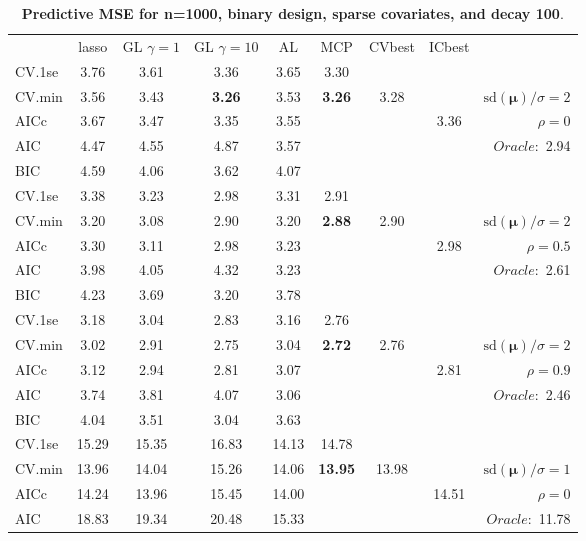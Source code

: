 \begin{table}\vspace{-.5cm}
\caption[l]{ { \bf Predictive MSE for n=1000, binary design, 
sparse covariates, and  decay  100}.}
\vspace{-.5cm}
\footnotesize{}
\begin{center}
\begin{tabular}{l*{7}{c}|r}
 & lasso & GL $\gamma=1$ & GL $\gamma=10$ & AL & MCP  & CVbest & ICbest  \\
\cline{1-9}
CV.1se & 3.76 & 3.61 & 3.36 & 3.65 & 3.30 & & & \\
CV.min & 3.56 & 3.43 & {\bf 3.26} & 3.53 & {\bf 3.26} & 3.28 & & $\mathrm{sd}(\mathbf{\mu})/\sigma=2$ \\
AICc & 3.67 & 3.47 & 3.35 & 3.55 & & & 3.36 &  $\rho=0$ \\
AIC & 4.47 & 4.55 & 4.87 & 3.57 & & & &  \multirow{2}{*}{$Oracle: $ 2.94} \\
BIC & 4.59 & 4.06 & 3.62 & 4.07 & & & &  \\
 \hline 
CV.1se & 3.38 & 3.23 & 2.98 & 3.31 & 2.91 & & & \\
CV.min & 3.20 & 3.08 & 2.90 & 3.20 & {\bf 2.88} & 2.90 & & $\mathrm{sd}(\mathbf{\mu})/\sigma=2$ \\
AICc & 3.30 & 3.11 & 2.98 & 3.23 & & & 2.98 &  $\rho=0.5$ \\
AIC & 3.98 & 4.05 & 4.32 & 3.23 & & & &  \multirow{2}{*}{$Oracle: $ 2.61} \\
BIC & 4.23 & 3.69 & 3.20 & 3.78 & & & &  \\
 \hline 
CV.1se & 3.18 & 3.04 & 2.83 & 3.16 & 2.76 & & & \\
CV.min & 3.02 & 2.91 & 2.75 & 3.04 & {\bf 2.72} & 2.76 & & $\mathrm{sd}(\mathbf{\mu})/\sigma=2$ \\
AICc & 3.12 & 2.94 & 2.81 & 3.07 & & & 2.81 &  $\rho=0.9$ \\
AIC & 3.74 & 3.81 & 4.07 & 3.06 & & & &  \multirow{2}{*}{$Oracle: $ 2.46} \\
BIC & 4.04 & 3.51 & 3.04 & 3.63 & & & &  \\
 \hline 
CV.1se & 15.29 & 15.35 & 16.83 & 14.13 & 14.78 & & & \\
CV.min & 13.96 & 14.04 & 15.26 & 14.06 & {\bf 13.95} & 13.98 & & $\mathrm{sd}(\mathbf{\mu})/\sigma=1$ \\
AICc & 14.24 & 13.96 & 15.45 & 14.00 & & & 14.51 &  $\rho=0$ \\
AIC & 18.83 & 19.34 & 20.48 & 15.33 & & & &  \multirow{2}{*}{$Oracle: $ 11.78} \\

\end{tabular}
\end{center}
\end{table}
